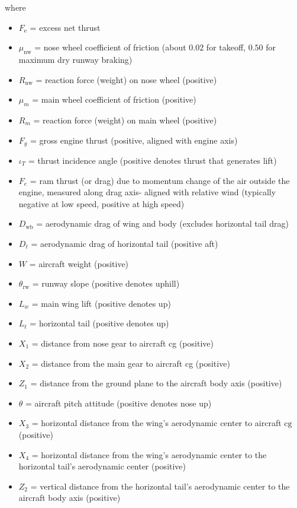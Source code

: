 \documentclass[
]{book}
\providecommand{\tightlist}{%
  \setlength{\itemsep}{0pt}\setlength{\parskip}{0pt}}
\begin{document}
where

\begin{itemize}
\tightlist
\item
  \(F_{\text{e}}\) = excess net thrust
\item
  \(\mu_{\text{nw}}\) = nose wheel coefficient of friction (about \(0.02\) for takeoff, \(0.50\) for maximum dry runway braking)
\item
  \(R_{\text{nw}}\) = reaction force (weight) on nose wheel (positive)
\item
  \(\mu_m\) = main wheel coefficient of friction (positive)
\item
  \(R_m\) = reaction force (weight) on main wheel (positive)
\item
  \(F_g\) = gross engine thrust (positive, aligned with engine axis)
\item
  \(\iota_T\) = thrust incidence angle (positive denotes thrust that generates lift)
\item
  \(F_e\) = ram thrust (or drag) due to momentum change of the air outside the engine, measured along drag axis- aligned with relative wind (typically negative at low speed, positive at high speed)
\item
  \(D_{\text{wb}}\) = aerodynamic drag of wing and body (excludes horizontal tail drag)
\item
  \(D_t\) = aerodynamic drag of horizontal tail (positive aft)
\item
  \(W\) = aircraft weight (positive)
\item
  \(\theta_{\text{rw}}\) = runway slope (positive denotes uphill)
\item
  \(L_w\) = main wing lift (positive denotes up)
\item
  \(L_t\) = horizontal tail (positive denotes up)
\item
  \(X_1\) = distance from nose gear to aircraft cg (positive)
\item
  \(X_2\) = distance from the main gear to aircraft cg (positive)
\item
  \(Z_1\) = distance from the ground plane to the aircraft body axis (positive)
\item
  \(\theta\) = aircraft pitch attitude (positive denotes nose up)
\item
  \(X_3\) = horizontal distance from the wing's aerodynamic center to aircraft \(\mathrm{cg}\) (positive)
\item
  \(X_4\) = horizontal distance from the wing's aerodynamic center to the horizontal tail's aerodynamic center (positive)
\item
  \(Z_2\) = vertical distance from the horizontal tail's aerodynamic center to the aircraft body axis (positive)
\end{itemize}
\end{document}
